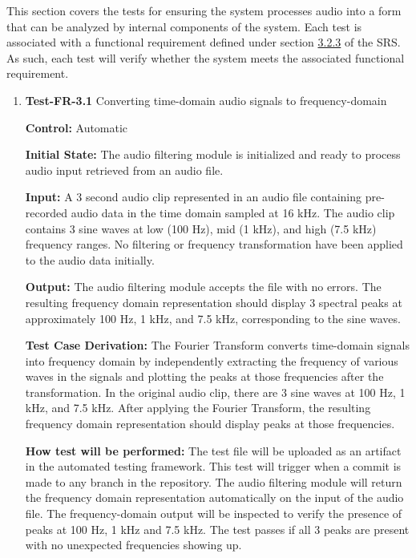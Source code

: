 \documentclass[12pt, titlepage]{article}
\begin{document}
This section covers the tests for ensuring the system processes audio into a
form that can be analyzed by internal components of the system. Each test is
associated with a functional requirement defined under section
\hyperref[SRS-sec:FR3]{3.2.3} of the SRS. As such, each test will verify whether
the system meets the associated functional requirement. 

\begin{enumerate}

\item{\textbf{Test-FR-3.1} Converting time-domain audio signals to
frequency-domain \\}

\textbf{Control:} Automatic
					
\textbf{Initial State:} 
The audio filtering module is initialized and ready to process audio input
retrieved from an audio file. 
					
\textbf{Input:}
A 3 second audio clip represented in an audio file containing pre-recorded audio
data in the time domain sampled at 16 kHz. The audio clip contains 3 sine waves
at low (100 Hz), mid (1 kHz), and high (7.5 kHz) frequency ranges. No filtering or
frequency transformation have been applied to the audio data initially.
					
\textbf{Output:}
The audio filtering module accepts the file with no errors. The resulting
frequency domain representation should display 3 spectral peaks at approximately
100 Hz, 1 kHz, and 7.5 kHz, corresponding to the sine waves.

\textbf{Test Case Derivation:} 
The Fourier Transform converts time-domain signals into frequency domain by
independently extracting the frequency of various waves in the signals and
plotting the peaks at those frequencies after the transformation. In the
original audio clip, there are 3 sine waves at 100 Hz, 1 kHz, and 7.5 kHz. After
applying the Fourier Transform, the resulting frequency domain representation
should display peaks at those frequencies.
					
\textbf{How test will be performed:}
The test file will be uploaded as an artifact in the automated testing
framework. This test will trigger when a commit is made to any branch in the
repository. The audio filtering module will return the frequency domain
representation automatically on the input of the audio file. The
frequency-domain output will be inspected to verify the presence of peaks at 100
Hz, 1 kHz and 7.5 kHz. The test passes if all 3 peaks are present with no
unexpected frequencies showing up.  
					

\end{enumerate}
\end{document}

